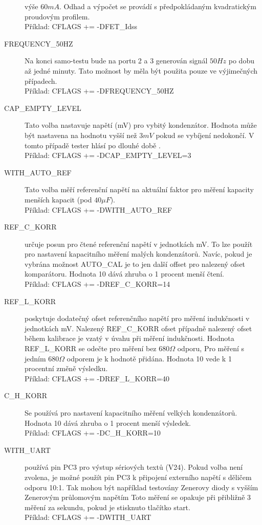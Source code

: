 \begin{description}
výše \(60mA\). Odhad a výpočet se provádí s předpokládaným kvadratickým proudovým profilem.\\
Příklad: CFLAGS += -DFET\_Idss
  \item[FREQUENCY\_50HZ] Na konci samo-testu bude na portu 2 a 3 generován signál \(50Hz\) po
dobu až jedné minuty.
Tato možnost by měla být použita pouze ve výjimečných případech.\\
Příklad: CFLAGS += -DFREQUENCY\_50HZ
  \item[CAP\_EMPTY\_LEVEL] Tato volba nastavuje napětí (mV) pro vybitý kondenzátor.
Hodnota může být nastavena na hodnotu vyšší než \(3mV\) pokud se vybíjení nedokončí.
V tomto případě tester hlásí po dlouhé době .\\
Příklad: CFLAGS += -DCAP\_EMPTY\_LEVEL=3
  \item[WITH\_AUTO\_REF] Tato volba měří referenční napětí na aktuální faktor pro měření kapacity
menších kapacit (pod \(40\mu F\)).\\
Příklad: CFLAGS += -DWITH\_AUTO\_REF
  \item[REF\_C\_KORR] určuje posun pro čtené referenční napětí v jednotkách mV.
To lze použít pro nastavení kapacitního měření malých kondenzátorů.
Navíc, pokud je vybrána možnost AUTO\_CAL je to jen další offset pro
nalezený ofset komparátoru.
Hodnota 10 dává zhruba o 1 procent menší čtení.\\
Příklad: CFLAGS += -DREF\_C\_KORR=14
  \item[REF\_L\_KORR] poskytuje dodatečný ofset referenčního napětí pro měření indukčnosti
v jednotkách mV. Nalezený REF\_C\_KORR ofset případně nalezený ofset během kalibrace
je vzatý v úvahu při měření indukčnosti.
Hodnota REF\_L\_KORR se odečte pro měření bez \(680\Omega\) odporu,
Pro měření s jedním \(680\Omega\) odporem je  k hodnotě přidána.
Hodnota 10 vede k 1 procentní změně výsledku.\\
Příklad: CFLAGS += -DREF\_L\_KORR=40
  \item[C\_H\_KORR] Se používá pro nastavení kapacitního měření velkých kondenzátorů.
Hodnota 10 dává zhruba o 1 procent menší výsledek.\\
Příklad: CFLAGS += -DC\_H\_KORR=10
  \item[WITH\_UART] používá pin PC3 pro výstup sériových textů (V24). Pokud volba není zvolena,
je možné použít pin PC3 k připojení externího napětí s děličem odporu 10:1.
Tak mohou být například testovány Zenerovy diody s vyšším Zenerovým průlomovým napětím
Toto měření se opakuje při přibližně 3 měření za sekundu, pokud je stisknuto tlačítko start.\\
Příklad: CFLAGS += -DWITH\_UART


\end{description}
